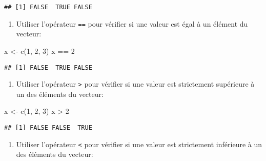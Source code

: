 \documentclass[
]{article}
\newenvironment{Shaded}{\begin{snugshade}}{\end{snugshade}}
\newcommand{\DecValTok}[1]{\textcolor[rgb]{0.00,0.00,0.81}{#1}}
\newcommand{\FunctionTok}[1]{\textcolor[rgb]{0.00,0.00,0.00}{#1}}
\newcommand{\NormalTok}[1]{#1}
\newcommand{\OtherTok}[1]{\textcolor[rgb]{0.56,0.35,0.01}{#1}}
\newcommand{\SpecialCharTok}[1]{\textcolor[rgb]{0.00,0.00,0.00}{#1}}
\providecommand{\tightlist}{%
  \setlength{\itemsep}{0pt}\setlength{\parskip}{0pt}}
\begin{document}
\begin{verbatim}
## [1] FALSE  TRUE FALSE
\end{verbatim}

\begin{enumerate}
\def\labelenumi{\arabic{enumi}.}
\setcounter{enumi}{6}
\tightlist
\item
  Utiliser l'opérateur \texttt{==} pour vérifier si une valeur est égal à un élément du vecteur:
\end{enumerate}

\begin{Shaded}
\begin{Highlighting}[]
\NormalTok{x }\OtherTok{\textless{}{-}} \FunctionTok{c}\NormalTok{(}\DecValTok{1}\NormalTok{, }\DecValTok{2}\NormalTok{, }\DecValTok{3}\NormalTok{)}
\NormalTok{x }\SpecialCharTok{==} \DecValTok{2}
\end{Highlighting}
\end{Shaded}

\begin{verbatim}
## [1] FALSE  TRUE FALSE
\end{verbatim}

\begin{enumerate}
\def\labelenumi{\arabic{enumi}.}
\setcounter{enumi}{7}
\tightlist
\item
  Utiliser l'opérateur \texttt{\textgreater{}} pour vérifier si une valeur est strictement supérieure à un des éléments du vecteur:
\end{enumerate}

\begin{Shaded}
\begin{Highlighting}[]
\NormalTok{x }\OtherTok{\textless{}{-}} \FunctionTok{c}\NormalTok{(}\DecValTok{1}\NormalTok{, }\DecValTok{2}\NormalTok{, }\DecValTok{3}\NormalTok{)}
\NormalTok{x }\SpecialCharTok{\textgreater{}} \DecValTok{2}
\end{Highlighting}
\end{Shaded}

\begin{verbatim}
## [1] FALSE FALSE  TRUE
\end{verbatim}

\begin{enumerate}
\def\labelenumi{\arabic{enumi}.}
\setcounter{enumi}{8}
\tightlist
\item
  Utiliser l'opérateur \texttt{\textless{}} pour vérifier si une valeur est strictement inférieure à un des éléments du vecteur:
\end{enumerate}
\end{document}
